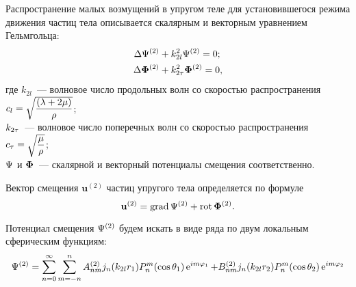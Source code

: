 Распространение малых возмущений в упругом теле для установившегося режима движения частиц тела описывается скалярным и векторным уравнением Гельмгольца:
\begin{align}
\Lap\P^{(2)} &+ k_{2l}^2\P^{(2)} = 0;\label{Helmholtz_scalar}\\
\Lap\F^{(2)} &+ k_{2\t}^2\F^{(2)} = 0,\label{Helmholtz_vector}
\end{align}
где $k_{2l}$~--- волновое число продольных волн со скоростью распространения \break 
$c_l = \sqrt{\df{(\la + 2\mu)}\r}$;\\
$k_{2\t}$~--- волновое число поперечных волн со скоростью распространения
$c_\t = \sqrt{\df\mu\r}$;\\
$\P$ и $\F$~--- скалярной и векторный потенциалы смещения соответственно.

Вектор смещения $\mathbf{u}^{(2)}$ частиц упругого тела определяется по формуле
$$
\mathbf{u}^{(2)} = \grad \P^{(2)} + \rot \F^{(2)}.
$$

Потенциал смещения $\P^{(2)}$ будем искать в виде ряда по двум локальным сферическим функциям:
$$
\P^{(2)} = \sum\limits_{n=0}^\infty \sum\limits_{m=-n}^n A_{nm}^{(2)} j_n(k_{2l}r_1)P_n^m(\cos\Q_1)\e^{im\f_1} + B_{nm}^{(2)} j_n(k_{2l}r_2)P_n^m(\cos\Q_2)\e^{im\f_2}
$$

